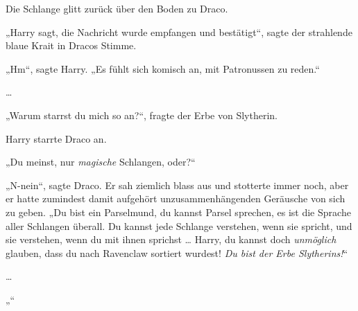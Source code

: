 Die Schlange glitt zurück über den Boden zu Draco.

„Harry sagt, die Nachricht wurde empfangen und bestätigt“, sagte der strahlende blaue Krait in Dracos Stimme.

„Hm“, sagte Harry.
„Es fühlt sich komisch an, mit Patronussen zu reden.“

…

„Warum starrst du mich so an?“, fragte der Erbe von Slytherin.


Harry starrte Draco an.

„Du meinst, nur \emph{magische} Schlangen, oder?“

„N-nein“, sagte Draco. Er sah ziemlich blass aus und stotterte immer noch, aber er hatte zumindest damit aufgehört unzusammenhängenden Geräusche von sich zu geben.
„Du bist ein Parselmund, du kannst Parsel sprechen, es ist die Sprache aller Schlangen überall. Du kannst jede Schlange verstehen, wenn sie spricht, und sie verstehen, wenn du mit ihnen sprichst … Harry, du kannst doch \emph{unmöglich} glauben, dass du nach Ravenclaw sortiert wurdest! \emph{Du bist der Erbe Slytherins!}“

…

„“

